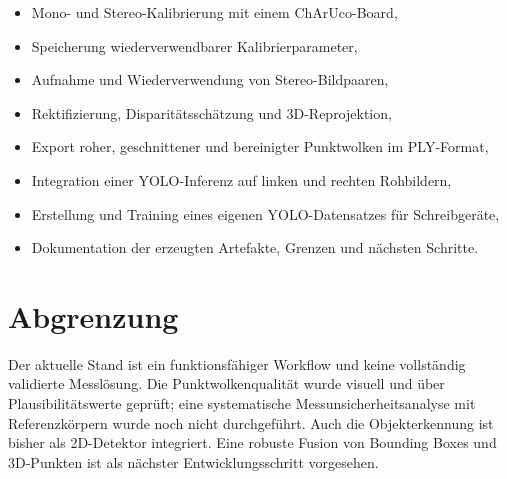 \begin{itemize}
    \item Mono- und Stereo-Kalibrierung mit einem ChArUco-Board,
    \item Speicherung wiederverwendbarer Kalibrierparameter,
    \item Aufnahme und Wiederverwendung von Stereo-Bildpaaren,
    \item Rektifizierung, Disparitätsschätzung und 3D-Reprojektion,
    \item Export roher, geschnittener und bereinigter Punktwolken im PLY-Format,
    \item Integration einer YOLO-Inferenz auf linken und rechten Rohbildern,
    \item Erstellung und Training eines eigenen YOLO-Datensatzes für Schreibgeräte,
    \item Dokumentation der erzeugten Artefakte, Grenzen und nächsten Schritte.
\end{itemize}

\section{Abgrenzung}

Der aktuelle Stand ist ein funktionsfähiger Workflow und keine vollständig validierte
Messlösung. Die Punktwolkenqualität wurde visuell und über Plausibilitätswerte geprüft; eine
systematische Messunsicherheitsanalyse mit Referenzkörpern wurde noch nicht durchgeführt.
Auch die Objekterkennung ist bisher als 2D-Detektor integriert. Eine robuste Fusion von
Bounding Boxes und 3D-Punkten ist als nächster Entwicklungsschritt vorgesehen.
